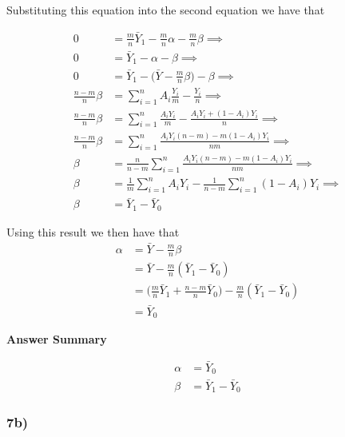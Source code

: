 \documentclass[
  11pt,
  letterpaper,
  DIV=11,
  numbers=noendperiod]{scrartcl}
\begin{document}
Substituting this equation into the second equation we have that

\[
\begin{aligned}
0 &= \frac{m}{n} \bar Y_1- \frac{m}{n}\alpha - \frac{m}{n}\beta \implies \\ 
0 &= \bar Y_1- \alpha - \beta \implies \\ 
0 &= \bar Y_1 - \biggr(\bar Y - \frac{m}{n}\beta\biggr) - \beta \implies \\
\frac{n-m}{n}\beta &= \sum_{i = 1}^n A_i\frac{Y_i}{m} - \frac{Y_i}{n} \implies \\
\frac{n-m}{n}\beta &= \sum_{i = 1}^n \frac{A_iY_i}{m} - \frac{A_iY_i + (1-A_i)Y_i}{n} \implies \\
\frac{n-m}{n}\beta &= \sum_{i = 1}^n \frac{A_iY_i(n-m) -  m(1-A_i)Y_i}{nm} \implies \\
\beta &= \frac{n}{n-m}\sum_{i = 1}^n \frac{A_iY_i(n-m) -  m(1-A_i)Y_i}{nm}\implies  \\
\beta &= \frac{1}{m}\sum_{i = 1}^n A_iY_i - \frac{1}{n-m}\sum_{i = 1}^n(1-A_i)Y_i \implies \\
\beta &= \bar Y_1 - \bar Y_0
\end{aligned}
\]

Using this result we then have that \[
\begin{aligned}
\alpha &= \bar Y - \frac{m}{n}\beta \\
&= \bar Y - \frac{m}{n}(\bar Y_1 - \bar Y_0) \\
&= \biggr(\frac{m}{n}\bar Y_1 + \frac{n-m}{n}\bar Y_0\biggr) - \frac{m}{n}(\bar Y_1 - \bar Y_0) \\
&= \bar Y_0
\end{aligned}
\]

\begin{tcolorbox}[enhanced jigsaw, arc=.35mm, colback=white, bottomrule=.15mm, breakable, opacityback=0, rightrule=.15mm, toprule=.15mm, leftrule=.75mm, left=2mm, colframe=quarto-callout-note-color-frame]

\textbf{Answer Summary}\vspace{2mm}

\[
\boxed{
\begin{aligned}
\alpha &= \bar Y_0 \\
\beta &= \bar Y_1 - \bar Y_0
\end{aligned}
}
\]

\end{tcolorbox}

\hypertarget{b-2}{%
\subsubsection{7b)}\label{b-2}}
\end{document}
